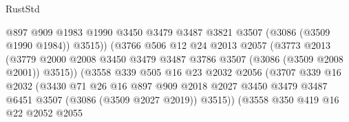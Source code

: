 \begin{lexlean}{RustStd}
\begin{coremodule}
                                  @897
                                  @909
                                  @1983
                                  @1990
                                  @3450
                                  @3479
                                  @3487
                                  @3821
                                  @3507
                                  (@3086 (@3509 @1990 @1984))
                                  @3515))
                              (@3766
                                @506
                                @12
                                @24
                                @2013
                                @2057
                                (@3773
                                  @2013
                                  (@3779
                                    @2000
                                    @2008
                                    @3450
                                    @3479
                                    @3487
                                    @3786
                                    @3507
                                    (@3086 (@3509 @2008 @2001))
                                    @3515))
                                (@3558
                                  @339
                                  @505
                                  @16
                                  @23
                                  @2032
                                  @2056
                                  (@3707
                                    @339
                                    @16
                                    @2032
                                    (@3430
                                      @71
                                      @26
                                      @16
                                      @897
                                      @909
                                      @2018
                                      @2027
                                      @3450
                                      @3479
                                      @3487
                                      @6451
                                      @3507
                                      (@3086 (@3509 @2027 @2019))
                                      @3515))
                                  (@3558
                                    @350
                                    @419
                                    @16
                                    @22
                                    @2052
                                    @2055

\end{coremodule}
\end{lexlean}
